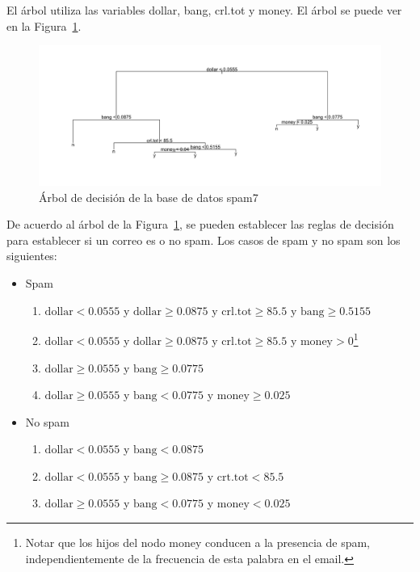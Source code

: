 \documentclass[12pt,a4paper,twoside,openright,titlepage,final]{article}
\begin{document}
El árbol utiliza las variables dollar, bang, crl.tot y money. El árbol se puede ver en la Figura~\ref{fig:spam_plot}.\\

\begin{figure}[tbph!]
\centering
\includegraphics[width=0.9\linewidth]{imagenes/spam_plot}
\caption{Árbol de decisión de la base de datos spam7}
\label{fig:spam_plot}
\end{figure}

De acuerdo al árbol de la Figura~\ref{fig:spam_plot}, se pueden establecer las reglas de decisión para establecer si un correo es o no spam. Los casos de spam y no spam son los siguientes:

\begin{itemize}
	\item Spam
	
	\begin{enumerate}
		\item $\text{dollar} < 0.0555$ y $\text{dollar} \geq 0.0875$ y $\text{crl.tot} \geq 85.5$ y $\text{bang} \geq 0.5155$
		
		\item $\text{dollar} < 0.0555$ y $\text{dollar} \geq 0.0875$ y $\text{crl.tot} \geq 85.5$ y $\text{money} > 0$\footnote{Notar que los hijos del nodo money conducen a la presencia de spam, independientemente de la frecuencia de esta palabra en el email.}
		
		\item $\text{dollar} \geq 0.0555$ y $\text{bang} \geq 0.0775$
		
		\item $\text{dollar} \geq 0.0555$ y $\text{bang} < 0.0775$ y $\text{money} \geq 0.025$
	\end{enumerate}
	
	\item No spam
	
	\begin{enumerate}
		\item $\text{dollar} < 0.0555$ y $\text{bang} < 0.0875$
		
		\item $\text{dollar} < 0.0555$ y $\text{bang} \geq 0.0875$ y $\text{crt.tot} < 85.5$
		
		\item $\text{dollar} \geq 0.0555$ y $\text{bang} < 0.0775$ y $\text{money} < 0.025$
		
	\end{enumerate}
\end{itemize}
\end{document}
